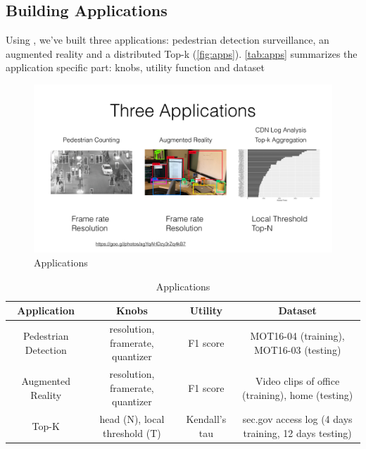 \subsection{Building \sysname{} Applications}
\label{sec:build-appl}

Using \sysname{}, we've built three applications: pedestrian detection
surveillance, an augmented reality and a distributed Top-k (\autoref{fig:apps}).
\autoref{tab:apps} summarizes the application specific part: knobs, utility
function and dataset

\begin{figure}
  \centering
  \includegraphics[width=\textwidth]{figures/apps.pdf}
  \caption{Applications}
  \label{fig:apps}
\end{figure}

\begin{table}
  \small
  \centering
  \begin{tabular}{|c|c|c|c|}
    \hline
    Application & Knobs & Utility & Dataset \\
    \hline
    Pedestrian Detection & resolution, framerate, quantizer
                        & F1 score & MOT16-04 (training), MOT16-03 (testing) \\
    \hline
    Augmented Reality & resolution, framerate, quantizer
                        & F1 score & Video clips of office (training), home (testing) \\
    \hline
    Top-K & head (N), local threshold (T) & Kendall's tau & sec.gov access log
                                                          (4 days training, 12 days testing)  \\
    \hline
  \end{tabular}
  \caption{\sysname{} Applications}
  \label{tab:apps}
\end{table}


